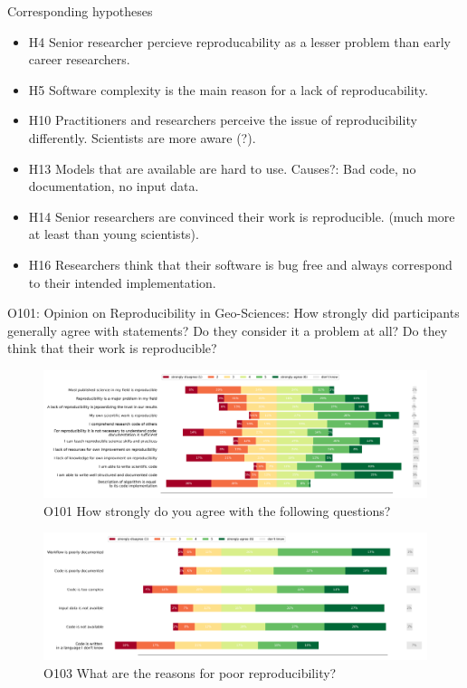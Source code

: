 \documentclass{article}
\begin{document}
Corresponding hypotheses
\begin{itemize}
	\item H4 Senior researcher percieve reproducability as a lesser problem than early career researchers.
 	\item H5 Software complexity is the main reason for a lack of reproducability.
	\item H10 Practitioners and researchers perceive the issue of reproducibility differently. Scientists are more aware (?).
	\item H13 Models that are available are hard to use. Causes?: Bad code, no documentation, no input data.
	\item H14 Senior researchers are convinced their work is reproducible. (much more at least than young scientists).
	\item H16 Researchers think that their software is bug free and always correspond to their intended implementation.
\end{itemize}

O101: Opinion on Reproducibility in Geo-Sciences: How strongly did participants generally agree with statements?
Do they consider it a problem at all? Do they think that their work is reproducible?

\begin{figure}[!p]
    \centering
    \includegraphics[width=\textwidth]{../figs/O101.png}
	\caption{O101 How strongly do you agree with the following questions?}
    \label{fig:O101}
\end{figure}

\begin{figure}[!p]
    \centering
    \includegraphics[width=\textwidth]{../figs/O103.png}
	\caption{O103 What are the reasons for poor reproducibility?}
    \label{fig:O103}
\end{figure}
\end{document}
